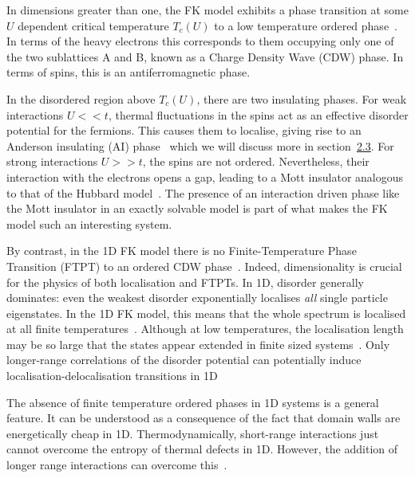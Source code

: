 In dimensions greater than one, the FK model exhibits a phase transition at some \(U\) dependent critical temperature \(T_c(U)\) to a low temperature ordered phase~\autocite{maskaThermodynamicsTwodimensionalFalicovKimball2006}. In terms of the heavy electrons this corresponds to them occupying only one of the two sublattices A and B, known as a Charge Density Wave (CDW) phase. In terms of spins, this is an antiferromagnetic phase.

In the disordered region above \(T_c(U)\), there are two insulating phases. For weak interactions \(U << t\), thermal fluctuations in the spins act as an effective disorder potential for the fermions. This causes them to localise, giving rise to an Anderson insulating (AI) phase~\autocite{andersonAbsenceDiffusionCertain1958} which we will discuss more in section~\protect\hyperlink{bg-disorder-and-localisation}{2.3}. For strong interactions \(U >> t\), the spins are not ordered. Nevertheless, their interaction with the electrons opens a gap, leading to a Mott insulator analogous to that of the Hubbard model~\autocite{brandtThermodynamicsCorrelationFunctions1989}. The presence of an interaction driven phase like the Mott insulator in an exactly solvable model is part of what makes the FK model such an interesting system.

By contrast, in the 1D FK model there is no Finite-Temperature Phase Transition (FTPT) to an ordered CDW phase~\autocite{liebAbsenceMottTransition1968}. Indeed, dimensionality is crucial for the physics of both localisation and FTPTs. In 1D, disorder generally dominates: even the weakest disorder exponentially localises \emph{all} single particle eigenstates. In the 1D FK model, this means that the whole spectrum is localised at all finite temperatures~\autocite{goldshteinPurePointSpectrum1977,abrahamsScalingTheoryLocalization1979,kramerLocalizationTheoryExperiment1993}. Although at low temperatures, the localisation length may be so large that the states appear extended in finite sized systems~\autocite{antipovInteractionTunedAndersonMott2016}. Only longer-range correlations of the disorder potential can potentially induce localisation-delocalisation transitions in 1D~\autocite{aubryAnalyticityBreakingAnderson1980,dassarmaLocalizationMobilityEdges1990,dunlapAbsenceLocalizationRandomdimer1990}

The absence of finite temperature ordered phases in 1D systems is a general feature. It can be understood as a consequence of the fact that domain walls are energetically cheap in 1D. Thermodynamically, short-range interactions just cannot overcome the entropy of thermal defects in 1D. However, the addition of longer range interactions can overcome this~\autocite{peierlsIsingModelFerromagnetism1936,kennedyItinerantElectronModel1986}.

